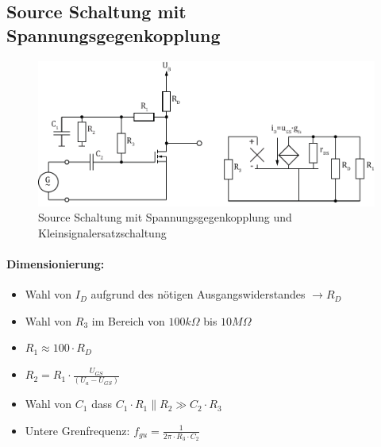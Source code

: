 



\subsection{Source Schaltung mit Spannungsgegenkopplung}
\begin{figure}[h!]
	\centering
	\includegraphics[width = \linewidth]{fet_source_u.pdf}
	\caption{Source Schaltung mit Spannungsgegenkopplung und Kleinsignalersatzschaltung}
	\label{fet:sourceschaltung_u}
\end{figure}
\noindent
\paragraph{Dimensionierung:}
\begin{itemize}
	\item Wahl von $I_D$ aufgrund des nötigen Ausgangswiderstandes $\rightarrow R_D$
	\item Wahl von $R_3$ im Bereich von $100k\Omega$ bis $10M\Omega$
	\item $R_1 \approx 100\cdot R_D$
	\item $R_2 = R_1 \cdot \frac{U_{GS}}{(U_a-U_{GS})}$
	\item Wahl von $C_1$ dass $C_1 \cdot R_1 \parallel R_2 \gg C_2 \cdot R_3$
	\item Untere Grenfrequenz: $f_{gu} = \frac{1}{2\pi \cdot R_3 \cdot C_2}$
\end{itemize}